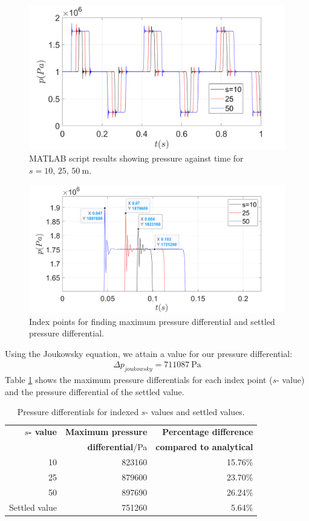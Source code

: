 \begin{figure}[H]
    \centering
    \includegraphics[width = 0.9 \textwidth]{img/fig1.png}
    \caption{MATLAB script results showing pressure against time for $s=10,\,25,\,\SI{50}{\meter}$.}
    \label{pressure1}
\end{figure}
\begin{figure}[H]
    \centering
    \includegraphics[width = 0.9 \textwidth]{img/fig3.png}
    \caption{Index points for finding maximum pressure differential and settled pressure differential.}
    \label{pressure2}
\end{figure}
Using the Joukowsky equation, we attain a value for our pressure differential:
\begin{gather}
    \Delta p_{joukowsky} = \SI{711087}{\pascal}
\end{gather}
Table \ref{matlabResults} shows the maximum pressure differentials for each index point ($s$- value) and the pressure differential of the settled value.
\begin{table}[H]
    \centering
    \begin{tabular}{@{}rrr@{}}
        \toprule
        \textbf{$s$- value} & \textbf{Maximum pressure } & \textbf{Percentage difference}\\
        & \textbf{differential}/\si{\pascal} & \textbf{compared to analytical}\\
        \midrule
        10 & 823160 & 15.76\%\\
        25 & 879600 & 23.70\%\\
        50 & 897690 & 26.24\%\\
        Settled value & 751260 & 5.64\%\\
        \bottomrule
    \end{tabular}
    \caption{Pressure differentials for indexed $s$- values and settled values.}
    \label{matlabResults}
\end{table}
